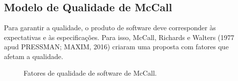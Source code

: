 \documentclass{article}
\begin{document}
\subsection*{Modelo de Qualidade de McCall}

Para garantir a qualidade, o produto de software deve corresponder às expectativas e às especificações. Para isso, McCall, Richards e Walters (1977 apud PRESSMAN; MAXIM, 2016) criaram uma proposta com fatores que afetam a qualidade.

\begin{figure}[h]
    \centering
    \caption{Fatores de qualidade de software de McCall.}

\end{figure}
\end{document}
